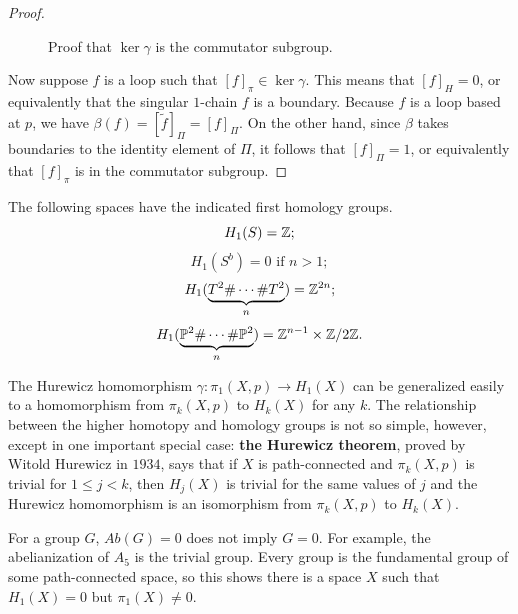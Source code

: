 \begin{proof}
\begin{figure}[htbp]
\caption{Proof that $\ker\gamma$ is the commutator subgroup.}
\end{figure}
Now suppose $f$ is a loop such that $[f]_\pi\in\ker\gamma$. This means that $[f]_H=0$, or equivalently that the singular $1$-chain $f$ is a boundary. Because $f$ is a loop based at $p$, we have $\beta(f)=[\widetilde{f}]_\Pi=[f]_\Pi$. On the other hand, since $\beta$ takes boundaries to the identity element of $\Pi$, it follows that $[f]_\Pi=1$, or equivalently that $[f]_\pi$ is in the commutator subgroup.
\end{proof}
\begin{corollary}\label{homology surface}
The following spaces have the indicated first homology groups.
\[H_1(S)=\mathbb{Z};\]
\[H_1(S^b)=0\text{ if }n>1;\]
\[H_1(\underbrace{T^2\#\cdots\#T^2}_{n})=\mathbb{Z}^{2n};\]
\[H_1(\underbrace{\mathbb{P}^2\#\cdots\#\mathbb{P}^2}_{n})=\mathbb{Z}^{n-1}\times\mathbb{Z}/2\mathbb{Z}.\]
\end{corollary}
\begin{remark}
The Hurewicz homomorphism $\gamma:\pi_1(X,p)\to H_1(X)$ can be generalized easily to a homomorphism from $\pi_k(X,p)$ to $H_k(X)$ for any $k$. The relationship between the higher homotopy and homology groups is not so simple, however, except in one important special case: \textbf{the Hurewicz theorem}, proved by Witold Hurewicz in $1934$, says that if $X$ is path-connected and $\pi_k(X,p)$ is trivial for $1\leq j<k$, then $H_j(X)$ is trivial for the same values of $j$ and the Hurewicz homomorphism is an isomorphism from $\pi_k(X,p)$ to $H_k(X)$.
\end{remark}
\begin{remark}
For a group $G$, $Ab(G)=0$ does not imply $G=0$. For example, the abelianization of $A_5$ is the trivial group. Every group is the fundamental group of some path-connected space, so this shows there is a space $X$ such that $H_1(X)=0$ but $\pi_1(X)\neq 0$.
\end{remark}
